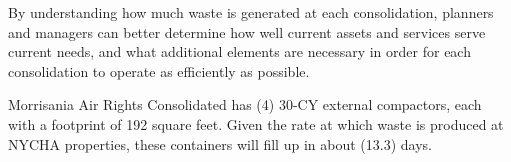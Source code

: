 
    By understanding how much waste is generated at each consolidation, planners and managers
    can better determine how well current assets and services serve current needs, and what additional 
    elements are necessary in order for each consolidation to operate as efficiently as possible. 

    Morrisania Air Rights Consolidated has (4) 30-CY external compactors, each with a footprint of 192 square feet. Given the rate at which waste is produced at NYCHA properties, these containers will fill
    up in about (13.3) days.